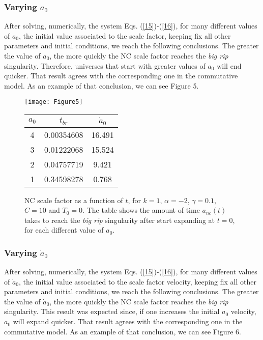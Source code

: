 \documentclass[12pt]{article}
\newcommand{\0}{{(0)}}
\newcommand{\1}{{(1)}}
\newcommand{\2}{{(2)}}
\begin{document}
{\subsubsection{Varying $a_0$}
\label{$a_0$}

After solving, numerically, the system Eqs. (\ref{15})-(\ref{16}), for many different values of $a_0$, the initial value associated to 
the scale factor, keeping fix all other parameters and initial conditions, we reach the following conclusions. The greater the value of 
$a_0$, the more quickly the NC scale factor reaches the {\it big rip} singularity. Therefore, universes that start with greater values of
$a_0$ will end quicker. That result agrees with the corresponding one in the commutative model. As an example of that conclusion, we can see Figure 5.

\begin{figure}[!htb]
	\centering
	\begin{minipage}[c]{0.49\linewidth}
		\centering
		\texttt{[image: Figure5]}
	\end{minipage}
	\hfill
	\begin{minipage}[c]{0.49\linewidth}
		\centering
		\begin{tabular}{ccc}\hline
			$a_0$ & $t_{br}$ & $\dot{a}_0$\\ \hline
			4 & 0.00354608 & 16.491 \\
			3 & 0.01222068 & 15.524 \\
			2 & 0.04757719 & 9.421 \\
			1 & 0.34598278 & 0.768 \\ \hline
		\end{tabular}
	\end{minipage}
	\caption{NC scale factor as a function of $t$, for $k = 1$, $\alpha = -2$, $\gamma = 0.1$, $C = 10$ and $T_0 = 0$.
	The table shows the amount of time $a_{nc}(t)$ takes to reach the {\it big rip} singularity after start expanding at $t=0$, 
		for each different value of $a_0$.}\label{fig5}
\end{figure}

\subsubsection{Varying $\dot{a}_0$}

After solving, numerically, the system Eqs. (\ref{15})-(\ref{16}), for many different values of $\dot{a}_0$, the initial value associated to 
the scale factor velocity, keeping fix all other parameters and initial conditions, we reach the following conclusions. The greater the value of 
$\dot{a}_0$, the more quickly the NC scale factor reaches the {\it big rip} singularity. This result was expected since, if one increases the initial
$a_0$ velocity, $a_0$ will expand quicker. That result agrees with the corresponding one in the commutative model. As an example of that conclusion, we can see Figure 6.

}
\end{document}
